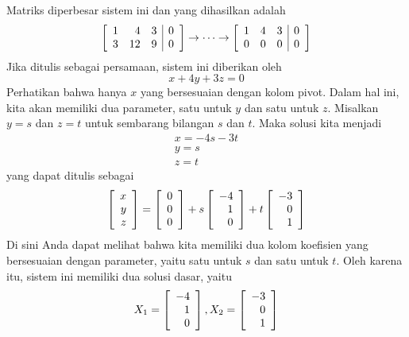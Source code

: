 \begin{solution}
Matriks diperbesar sistem ini dan \rref \;yang dihasilkan adalah
\begin{equation*}
\left[
\begin{array}{rrr|r}
1 & 4 & 3 & 0 \\
3 & 12 & 9 & 0
\end{array}
\right]
\rightarrow \cdots \rightarrow
\left[
\begin{array}{rrr|r}
1 & 4 & 3 & 0 \\
0 & 0 & 0 & 0
\end{array}
\right]
\end{equation*}
Jika ditulis sebagai persamaan, sistem ini diberikan oleh
\begin{equation*}
x + 4y +3z=0
\end{equation*}
Perhatikan bahwa hanya $x$ yang bersesuaian dengan kolom pivot. Dalam hal ini, kita akan memiliki dua parameter,
satu untuk $y$ dan satu untuk $z$. Misalkan $y = s$ dan $z=t$ untuk sembarang bilangan $s$ dan $t$. Maka solusi kita menjadi
\begin{equation*}
\begin{array}{c}
x = -4s - 3t \\
y = s \\
z = t
\end{array}
\end{equation*}
yang dapat ditulis sebagai
\begin{equation*}
\left[
\begin{array}{r}
x\\
y\\
z
\end{array}
\right]
=
\left[
\begin{array}{r}
0\\
0\\
0
\end{array}
\right]
+
s
\left[
\begin{array}{r}
-4 \\
1 \\
0
\end{array}
\right]
+ 
t
\left[
\begin{array}{r}
-3 \\
0 \\
1
\end{array}
\right]
\end{equation*}
Di sini Anda dapat melihat bahwa kita memiliki dua kolom koefisien yang bersesuaian dengan parameter, yaitu satu untuk $s$ dan satu untuk $t$.
Oleh karena itu, sistem ini memiliki dua solusi dasar, yaitu
\begin{equation*}
X_1=
\left[
\begin{array}{r}
-4 \\
1 \\
0
\end{array}
\right], X_2 = \left[
\begin{array}{r}
-3 \\
0 \\
1
\end{array}
\right]
\end{equation*} 
\end{solution}

